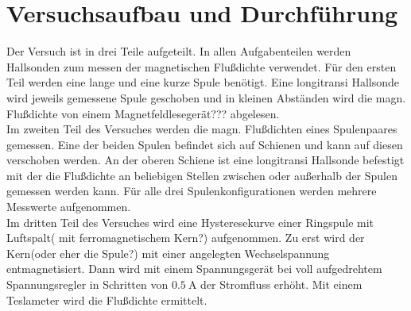 \section{Versuchsaufbau und Durchführung}
\label{sec:Durchführung}

Der Versuch ist in drei Teile aufgeteilt. In allen Aufgabenteilen werden Hallsonden zum messen der magnetischen Flußdichte verwendet.
Für den ersten Teil werden eine lange und eine kurze Spule benötigt. Eine longitransi Hallsonde wird jeweils gemessene Spule geschoben 
und in kleinen Abständen wird die magn. Flußdichte von einem Magnetfeldlesegerät??? abgelesen.\\
Im zweiten Teil des Versuches werden die magn. Flußdichten eines Spulenpaares gemessen. Eine der beiden Spulen befindet sich auf Schienen 
und kann auf diesen verschoben werden. An der oberen Schiene ist eine longitransi Hallsonde befestigt mit der die Flußdichte an beliebigen 
Stellen zwischen oder außerhalb der Spulen gemessen werden kann. Für alle drei Spulenkonfigurationen werden mehrere Messwerte aufgenommen.\\
Im dritten Teil des Versuches wird eine Hysteresekurve einer Ringspule mit Luftspalt( mit ferromagnetischem Kern?) aufgenommen. Zu erst wird der Kern(oder eher die Spule?) 
mit einer angelegten Wechselspannung entmagnetisiert. Dann wird mit einem Spannungsgerät bei voll aufgedrehtem Spannungsregler in Schritten von 
$\SI{0.5}{\ampere}$ der Stromfluss erhöht. Mit einem Teslameter wird die Flußdichte ermittelt.

\newpage